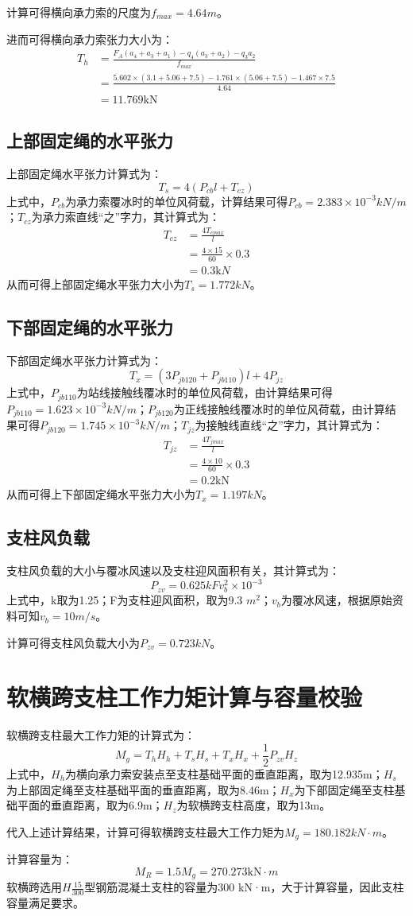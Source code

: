 计算可得横向承力索的尺度为$f_{max}=4.64m$。

进而可得横向承力索张力大小为：
\begin{align*}
	T_h&=\frac{F_A\left( a_4+a_3+a_1 \right) -q_4\left( a_3+a_2 \right) -q_3a_2}{f_{max}}
	\\
	&=\frac{5.602\times (3.1+5.06+7.5)-1.761\times (5.06+7.5)-1.467\times 7.5}{4.64}
	\\
	&=11.769\mathrm{ kN}
\end{align*}
\subsection{上部固定绳的水平张力}
上部固定绳水平张力计算式为：
$$
T_s=4(P_{cb}l+T_{cz})
$$
上式中，$P_{cb}$为承力索覆冰时的单位风荷载，计算结果可得$P_{cb}=2.383×10^{-3} kN/m$；$T_{cz}$为承力索直线“之”字力，其计算式为：
\begin{align*}
	T_{cz}&=\frac{4T_{cmax}}{l}
	\\
	&=\frac{4\times 15}{60}\times 0.3
	\\
	&=0.3\mathrm{ k}N
\end{align*}
从而可得上部固定绳水平张力大小为$T_s=1.772 kN$。

\subsection{下部固定绳的水平张力}
下部固定绳水平张力计算式为：
$$
T_x=(3P_{jb120}+P_{jb110})l+4P_{jz}
$$
上式中，$P_{jb110}$为站线接触线覆冰时的单位风荷载，由计算结果可得$P_{jb110}=1.623×10^{-3} kN/m$；$P_{jb120}$为正线接触线覆冰时的单位风荷载，由计算结果可得$P_{jb120}=1.745×10^{-3} kN/m$；$T_{jz}$为接触线直线“之”字力，其计算式为：
\begin{align*}
	T_{jz}&=\frac{4T_{jmax}}{l}
	\\
	&=\frac{4\times 10}{60}\times 0.3
	\\
	&=0.2\mathrm{ kN}
\end{align*}
从而可得上下部固定绳水平张力大小为$T_x=1.197 kN$。
\subsection{支柱风负载}
支柱风负载的大小与覆冰风速以及支柱迎风面积有关，其计算式为：
$$
P_{zv}=0.625kFv_{b}^{2}\times 10^{-3}
$$
上式中，k取为1.25；F为支柱迎风面积，取为9.3 $m^2$；$v_b$为覆冰风速，根据原始资料可知$v_b=10 m/s$。

计算可得支柱风负载大小为$P_{zv}=0.723 kN$。

\section{软横跨支柱工作力矩计算与容量校验}
软横跨支柱最大工作力矩的计算式为：
$$
M_g=T_hH_h+T_sH_s+T_xH_x+\frac{1}{2}P_{zv}H_z
$$
上式中，$H_h$为横向承力索安装点至支柱基础平面的垂直距离，取为12.935m；$H_s$为上部固定绳至支柱基础平面的垂直距离，取为8.46m；$H_x$为下部固定绳至支柱基础平面的垂直距离，取为6.9m；$H_z$为软横跨支柱高度，取为13m。

代入上述计算结果，计算可得软横跨支柱最大工作力矩为$M_g=180.182 kN·m$。

计算容量为：
$$
M_R=1.5M_g=270.273\mathrm{ kN}\cdot m
$$
软横跨选用$H\frac{15}{300}$型钢筋混凝土支柱的容量为300 kN·m，大于计算容量，因此支柱容量满足要求。
